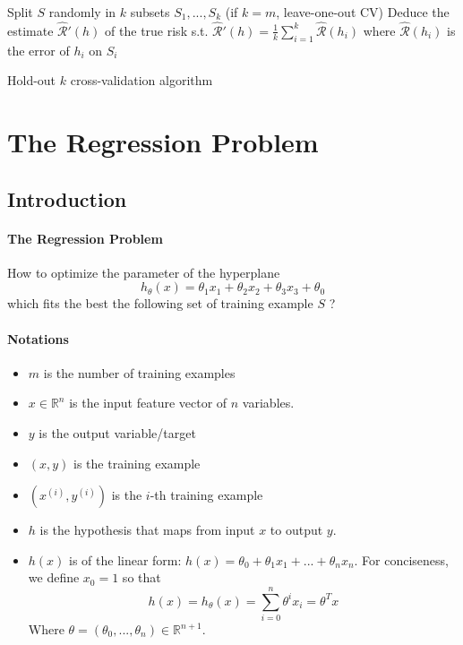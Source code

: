 \documentclass{article}
\begin{document}
\begin{algorithm}
Split $S$ randomly in $k$ subsets $S_1,...,S_k$ (if $k=m$, leave-one-out CV)\;
Deduce the estimate $\hat{\mathcal{R}}'(h)$ of the true risk s.t. $\hat{\mathcal{R}}'(h) =
\frac{1}{k} \sum_{i=1}^{k} \hat{\mathcal{R}}(h_i)$ where $\hat{\mathcal{R}}(h_i)$ is the error of $h_i$ on $S_i$\;
\caption{Hold-out $k$ cross-validation algorithm}
\end{algorithm}

\section{The Regression Problem}
\subsection{Introduction}
\paragraph{The Regression Problem}
How to optimize the parameter of the hyperplane
\[h_\theta (x) = \theta_1x_1 + \theta_2x_2 + \theta_3x_3 + \theta_0\]
which fits the best the following set of training example $S$ ?

\paragraph{Notations}
\begin{itemize}
\item $m$ is the number of training examples
\item $x\in \mathbb{R}^n$ is the input feature vector of $n$ variables.
\item $y$ is the output variable/target
\item $(x,y)$ is the training example
\item $(x^{(i)},y^{(i)})$ is the $i$-th training example
\item $h$ is the hypothesis that maps from input $x$ to output $y$.
\item $h(x)$ is of the linear form: $h(x)=\theta_0 + \theta_1x_1 + ... + \theta_nx_n$. For conciseness, we define $x_0=1$ so that 
\[ h(x) = h_{\theta}(x) = \sum_{i=0}^n \theta^ix_i = \theta^T x \]
Where $\theta=(\theta_0,...,\theta_n)\in \mathbb{R}^{n+1}$.
\end{itemize}
\end{document}
